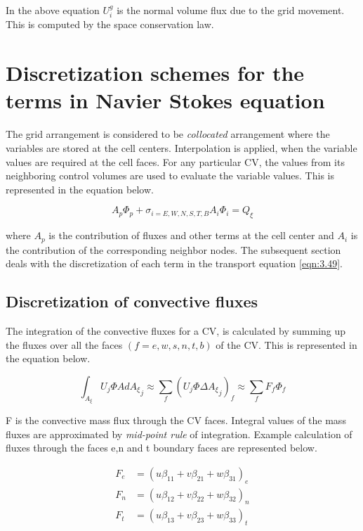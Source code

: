 In the above equation $U_{i}^{g}$ is the normal volume flux due to the grid movement. This is computed by the space conservation law.

\section{Discretization schemes for the terms in Navier Stokes equation}
The grid arrangement is considered to be \textit{collocated} arrangement where the variables are stored at the cell centers. Interpolation is applied, when the variable values are required at the cell faces. For any particular CV, the values from its neighboring control volumes are used to evaluate the variable values. This is represented in the equation below.

\begin{equation}
A_p \Phi_p + \sigma_{i=E,W,N,S,T,B} A_i \Phi_{i} = Q_{\xi}
\label{eqn:3.50} 
\end{equation}

where $A_p$ is the contribution of fluxes and other terms at the cell center and $A_i$ is the contribution of the corresponding neighbor nodes. The subsequent section deals with the discretization of each term in the transport equation \ref{eqn:3.49}.

\subsection{Discretization of convective fluxes}
The integration of the convective fluxes for a CV, is calculated by summing up the fluxes over all the faces $\left(f = e,w,s,n,t,b\right)$ of the CV. This is represented in the equation below.

\begin{equation}
\int_{A_{\xi}} U_j \Phi A d{A_{\xi}}_j \approx \sum_{f} \left(U_j \Phi \Delta {A_{\xi}}_j \right)_f \approx \sum_{f} F_f \Phi_f
\label{eqn:3.51}
\end{equation}

F is the convective mass flux through the CV faces. Integral values of the mass fluxes are approximated by \textit{mid-point rule} of integration. Example calculation of fluxes through the faces e,n and t boundary faces are represented below.

\begin{align}
F_e &= \left(u \beta_{11} + v \beta_{21} + w \beta_{31}\right)_e\\
F_n &= \left(u \beta_{12} + v \beta_{22} + w \beta_{32}\right)_n\\
F_t &= \left(u \beta_{13} + v \beta_{23} + w \beta_{33}\right)_t
\label{eqn:3.54}
\end{align}


